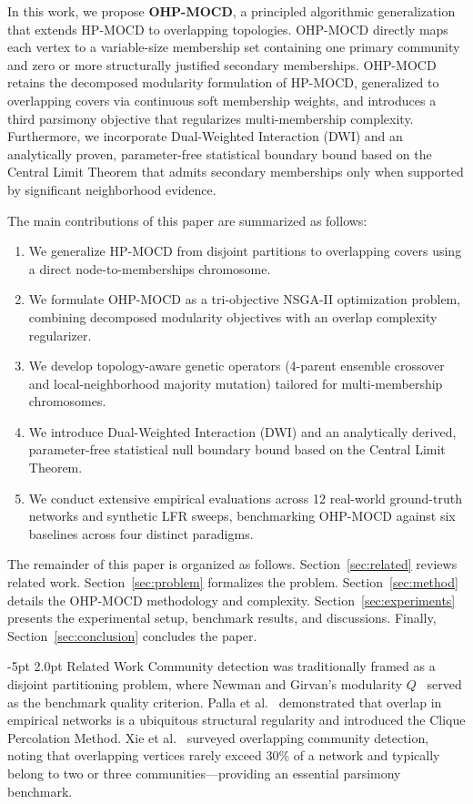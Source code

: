 \documentclass{svproc}
\makeatletter
\renewcommand\section{\@startsection{section}{1}{\z@}%
  {-5pt \@plus -1pt \@minus -0.5pt}%
  {2.0pt \@plus 0.5pt}%
  {\normalfont\large\bfseries\boldmath}}
\makeatother
\begin{document}
In this work, we propose \textbf{OHP-MOCD}, a principled algorithmic generalization that extends HP-MOCD to overlapping topologies. OHP-MOCD directly maps each vertex to a variable-size membership set containing one primary community and zero or more structurally justified secondary memberships. OHP-MOCD retains the decomposed modularity formulation of HP-MOCD, generalized to overlapping covers via continuous soft membership weights, and introduces a third parsimony objective that regularizes multi-membership complexity. Furthermore, we incorporate Dual-Weighted Interaction (DWI) and an analytically proven, parameter-free statistical boundary bound based on the Central Limit Theorem that admits secondary memberships only when supported by significant neighborhood evidence.

The main contributions of this paper are summarized as follows:
\begin{enumerate}
    \item We generalize HP-MOCD from disjoint partitions to overlapping covers using a direct node-to-memberships chromosome.
    \item We formulate OHP-MOCD as a tri-objective NSGA-II optimization problem, combining decomposed modularity objectives with an overlap complexity regularizer.
    \item We develop topology-aware genetic operators (4-parent ensemble crossover and local-neighborhood majority mutation) tailored for multi-membership chromosomes.
    \item We introduce Dual-Weighted Interaction (DWI) and an analytically derived, parameter-free statistical null boundary bound based on the Central Limit Theorem.
    \item We conduct extensive empirical evaluations across 12 real-world ground-truth networks and synthetic LFR sweeps, benchmarking OHP-MOCD against six baselines across four distinct paradigms.
\end{enumerate}

The remainder of this paper is organized as follows. Section~\ref{sec:related} reviews related work. Section~\ref{sec:problem} formalizes the problem. Section~\ref{sec:method} details the OHP-MOCD methodology and complexity. Section~\ref{sec:experiments} presents the experimental setup, benchmark results, and discussions. Finally, Section~\ref{sec:conclusion} concludes the paper.

\section{Related Work}\label{sec:related}
Community detection was traditionally framed as a disjoint partitioning problem, where Newman and Girvan's modularity $Q$~\cite{newman2004,newman2006} served as the benchmark quality criterion. Palla et al.~\cite{palla2005} demonstrated that overlap in empirical networks is a ubiquitous structural regularity and introduced the Clique Percolation Method. Xie et al.~\cite{xie2013} surveyed overlapping community detection, noting that overlapping vertices rarely exceed 30\% of a network and typically belong to two or three communities---providing an essential parsimony benchmark.
\end{document}
